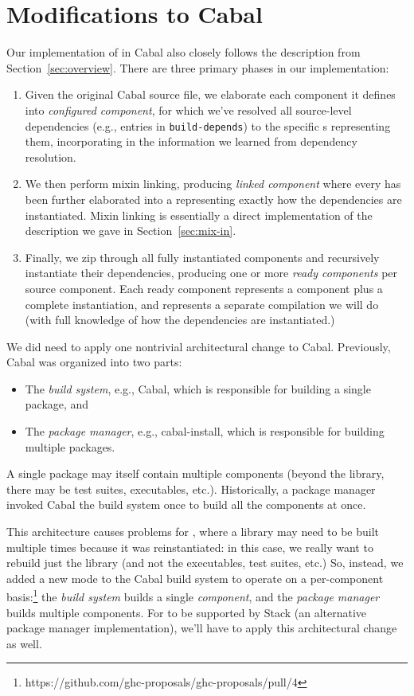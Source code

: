 \section{Modifications to Cabal}

Our implementation of \Backpack{} in Cabal also closely follows the description
from Section~\ref{sec:overview}.  There are three primary phases in our
implementation:

\begin{enumerate}
    \item Given the original Cabal source file, we elaborate each
    component it defines into \emph{configured component},
    for which we've resolved all source-level dependencies
    (e.g., entries in \verb|build-depends|) to the specific
    \cid{}s representing them, incorporating in the information
    we learned from dependency resolution.

    \item We then perform mixin linking, producing \emph{linked component}
    where every \cid{} has been further elaborated into a \uid{}
    representing exactly how the dependencies are instantiated.
    Mixin linking is essentially a direct implementation of the
    description we gave in Section~\ref{sec:mix-in}.

    \item Finally, we zip through all fully instantiated components
    and recursively instantiate their dependencies, producing one or
    more \emph{ready components} per source component.  Each ready
    component represents a component plus a complete instantiation,
    and represents a separate compilation we will do (with full
    knowledge of how the dependencies are instantiated.)
\end{enumerate}
%
We did need to apply one nontrivial architectural change to Cabal.
Previously, Cabal was organized into two parts:

\begin{itemize}
    \item The \emph{build system}, e.g., Cabal, which is responsible for
    building a single package, and

    \item The \emph{package manager}, e.g., cabal-install, which is
    responsible for building multiple packages.
\end{itemize}
%
A single package may itself contain multiple components (beyond the library,
there may be test suites, executables, etc.). Historically, a package manager
invoked Cabal the build system once to build all the components at once.

This architecture causes problems for \Backpack, where a library may need
to be built multiple times because it was reinstantiated: in this case, we really want to
rebuild just the library (and not the executables, test suites, etc.)
So, instead, we added a new mode to the Cabal build system to operate
on a per-component basis:\footnote{https://github.com/ghc-proposals/ghc-proposals/pull/4}
the \emph{build system} builds a single \emph{component}, and
the \emph{package manager} builds multiple components.  For \Backpack{} to be
supported by Stack (an alternative package manager implementation), we'll have
to apply this architectural change as well.
